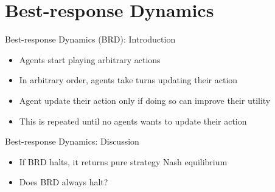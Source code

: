 \documentclass[11pt,aspectratio=169]{beamer}
\begin{document}
 
 \section{Best-response Dynamics}  
  
  \begin{frame}{Best-response Dynamics (BRD): Introduction}
   \begin{itemize}[<+->]
    \item Agents start playing \alert{arbitrary} actions
    \item In arbitrary order, agents take turns updating their action
    \item Agent update their action only if doing so can improve their utility
    \item This is repeated until no agents wants to update their action
   \end{itemize}
   \vspace{1em}
  \end{frame}
  
  
  \begin{frame}{Best-response Dynamics: Discussion}
   \begin{itemize}[<+->]
   \setlength{\itemsep}{1.5em}
    \item If BRD halts, it returns pure strategy Nash equilibrium
    \item Does BRD always halt?
   \end{itemize}
  \end{frame}
  
\end{document}

